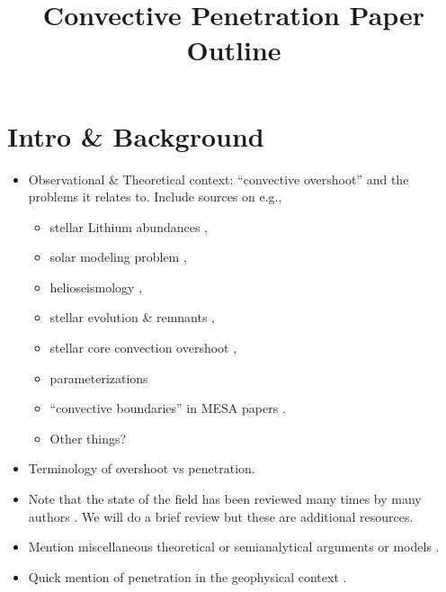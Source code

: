 \documentclass[12pt, fullpage]{article}
\begin{document}
\title{Convective Penetration Paper Outline}
\maketitle

\section{Intro \& Background}
\begin{itemize}
\item Observational \& Theoretical context: ``convective overshoot'' and the problems it relates to.
Include sources on e.g., 
\begin{itemize}
\item stellar Lithium abundances \citep[fig 4 of][]{pinsonneault_1997, dumont_etal_2021}, 
\item solar modeling problem \citep{basu_antia_2004, bahcall_etal_2005, zhang_li_2012, vinyoles_etal_2017, asplund_etal_2021},
\item helioseismology \citep[][]{christensen-dalsgaard_etal_2011},
\item stellar evolution \& remnants \citep{higgins_vink_2020}, 
\item stellar core convection overshoot \citep{claret_torres_2018, jermyn_etal_2018, viani_basu_2020, martinet_etal_2021}, 
\item parameterizations \citep{shaviv_salpeter_1973, maeder1975, herwig2000}
\item``convective boundaries'' in MESA papers \citep{paxton_etal_2011, paxton_etal_2013, paxton_etal_2018, paxton_etal_2019}. 
\item Other things?
\end{itemize}
\item Terminology of overshoot vs penetration.
\item Note that the state of the field has been reviewed many times by many authors \citep{marcus_etal_1983, zahn1991, browning_etal_2004, rogers_etal_2006, viallet_etal_2015, korre_etal_2019}.
We will do a brief review but these are additional resources.
\item Mention miscellaneous theoretical or semianalytical arguments or models \citep{roxburgh1965, roxburgh1978, roxburgh1989, roxburgh1992, roxburgh1998, marcus_etal_1983, zahn1991, hurlburt_etal_1994, rempel2004, canuto2011, viallet_etal_2015, rieutord2019, korre_etal_2019}.
\item Quick mention of penetration in the geophysical context \citep[including neat lab experiments like][]{deardorff_etal_1969}.

\end{itemize}
\end{document}
